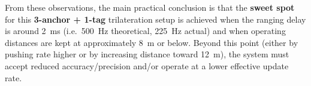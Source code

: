 \documentclass[a4paper,11pt]{article}
\begin{document}
From these observations, the main practical conclusion is that the \textbf{sweet spot} for this
\textbf{3-anchor + 1-tag} trilateration setup is achieved when the ranging delay is around
\SI{2}{ms} (i.e.\ \SI{500}{Hz} theoretical, \SI{225}{Hz} actual) and when operating distances are kept at
approximately \SI{8}{m} or below. Beyond this point (either by pushing rate higher or by increasing
distance toward \SI{12}{m}), the system must accept reduced accuracy/precision and/or operate at a
lower effective update rate.




	
	
	

%	
%	
%		
%		
%		
	
\end{document}
